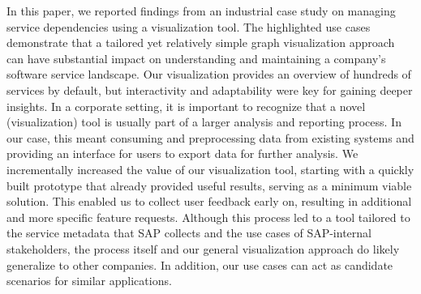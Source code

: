 \documentclass[conference]{IEEEtran}
\begin{document}
In this paper, we reported findings from an industrial case study on managing service dependencies using a visualization tool.
The highlighted use cases demonstrate that a tailored yet relatively simple graph visualization approach can have substantial impact on understanding and maintaining a company's software service landscape.
Our visualization provides an overview of hundreds of services by default, but interactivity and adaptability were key for gaining deeper insights.
In a corporate setting, it is important to recognize that a novel (visualization) tool is usually part of a larger analysis and reporting process.
In our case, this meant consuming and preprocessing data from existing systems and providing an interface for users to export data for further analysis.
We incrementally increased the value of our visualization tool, starting with a quickly built prototype that already provided useful results, serving as a minimum viable solution.
This enabled us to collect user feedback early on, resulting in additional and more specific feature requests.
Although this process led to a tool tailored to the service metadata that SAP collects and the use cases of SAP-internal stakeholders, the process itself and our general visualization approach do likely generalize to other companies.
In addition, our use cases can act as candidate scenarios for similar applications.



\end{document}
